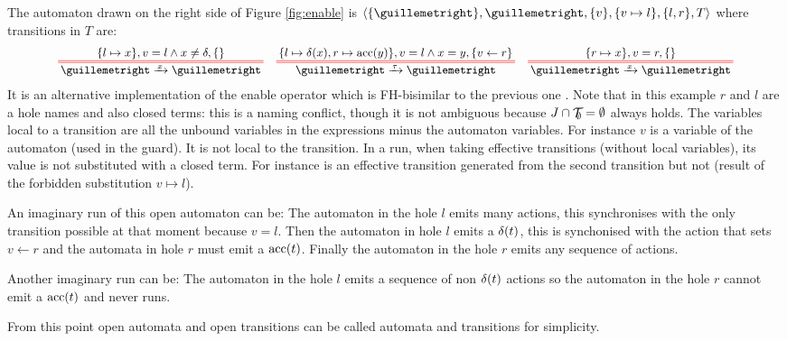 \documentclass{article}
\begin{document}
\begin{exi}
The automaton drawn on the right side of Figure \ref{fig:enable} is \(\OA{\mbrc{»}}{»}{\mbrc{v}}{\mbrc{v \mapsto l}}{\mbrc{l, r}}{T}\) where transitions in \(T\) are:
\begin{align*}
	\OT{»}{»}{x}{\mbrc{l \mapsto x}}{v = l \wedge x \neq \delta}{\mbrc{}} &&
	\OT{»}{»}{\tau}{\mbrc{l \mapsto \delta\mpar{x}, r \mapsto \act{acc}\mpar{y}}}{v = l \wedge x = y}{\mbrc{v \gets r}} &&
	\OT{»}{»}{x}{\mbrc{r \mapsto x}}{v = r}{\mbrc{}}
\end{align*}
It is an alternative implementation of the enable operator which is FH-bisimilar to the previous one \cite{henrio:01299562}.
Note that in this example \(r\) and \(l\) are a hole names and also closed terms: this is a naming conflict, though it is not ambiguous because \(J \cap {\mathcal{T}}_{\!\!\emptyset} = \emptyset\) always holds.
The variables local to a transition are all the unbound variables in the expressions minus the automaton variables.
For instance \(v\) is a variable of the automaton (used in the guard).
It is not local to the transition.
In a run, when taking effective transitions (without local variables), its value is not substituted with a closed term.
For instance  is an effective transition generated from the second transition but not  (result of the forbidden substitution \(v \mapsto l\)).

An imaginary run of this open automaton can be: The automaton in the hole \(l\) emits many actions, this synchronises with the only transition possible at that moment because \(v = l\).
Then the automaton in hole \(l\) emits a \(\delta{\left(t\right)}\), this is synchonised with the action that sets \(v \gets r\) and the automata in hole \(r\) must emit a \(\mathrm{acc}{\left(t\right)}\).
Finally the automaton in the hole \(r\) emits any sequence of actions.

Another imaginary run can be: The automaton in the hole \(l\) emits a sequence of non \(\delta{\left(t\right)}\) actions so the automaton in the hole \(r\) cannot emit a \(\mathrm{acc}{\left(t\right)}\) and never runs.
\end{exi}

From this point open automata and open transitions can be called automata and transitions for simplicity. %
\end{document}
